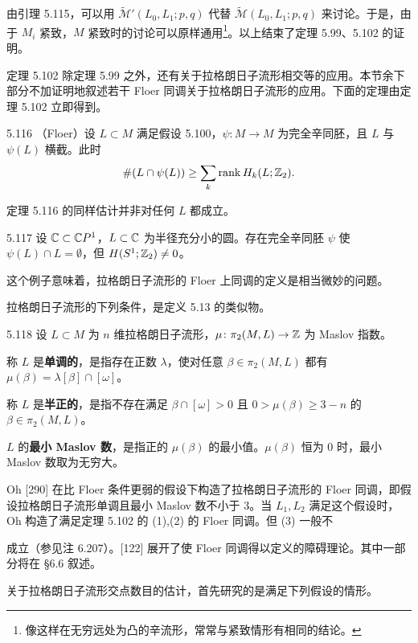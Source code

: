 由引理 5.115，可以用 $\tilde{\mathcal{M}}'(L_0,L_1;p,q)$ 代替 $\tilde{\mathcal{M}}(L_0,L_1;p,q)$ 来讨论。于是，由于 $M_i$ 紧致，$M$ 紧致时的讨论可以原样通用\footnote{像这样在无穷远处为凸的辛流形，常常与紧致情形有相同的结论。}。以上结束了定理 5.99、5.102 的证明。

定理 5.102 除定理 5.99 之外，还有关于拉格朗日子流形相交等的应用。本节余下部分不加证明地叙述若干 Floer 同调关于拉格朗日子流形的应用。下面的定理由定理 5.102 立即得到。

\begin{theorem}{5.116}
  （Floer）设 $L\subset M$ 满足假设 5.100，$\psi\colon M\to M$ 为完全辛同胚，且 $L$ 与 $\psi(L)$ 横截。此时
  \[
    \#(L\cap\psi(L))\ge\sum_k\mathrm{rank}\,H_k(L;\mathbb{Z}_2).
  \]
\end{theorem}

定理 5.116 的同样估计并非对任何 $L$ 都成立。

\begin{example}{5.117}
  设 $\mathbb{C}\subset\mathbb{C}P^1$，$L\subset\mathbb{C}$ 为半径充分小的圆。存在完全辛同胚 $\psi$ 使 $\psi(L)\cap L=\emptyset$，但 $H(S^1;\mathbb{Z}_2)\neq0$。
\end{example}

这个例子意味着，拉格朗日子流形的 Floer 上同调的定义是相当微妙的问题。

拉格朗日子流形的下列条件，是定义 5.13 的类似物。

\begin{definition}{5.118}
  设 $L\subset M$ 为 $n$ 维拉格朗日子流形，$\mu\colon\pi_2(M,L)\to\mathbb{Z}$ 为 Maslov 指数。

  称 $L$ 是\textbf{单调的}，是指存在正数 $\lambda$，使对任意 $\beta\in\pi_2(M,L)$ 都有 $\mu(\beta)=\lambda[\beta]\cap[\omega]$。

  称 $L$ 是\textbf{半正的}，是指不存在满足 $\beta\cap[\omega]>0$ 且 $0>\mu(\beta)\ge3-n$ 的 $\beta\in\pi_2(M,L)$。

  $L$ 的\textbf{最小 Maslov 数}，是指正的 $\mu(\beta)$ 的最小值。$\mu(\beta)$ 恒为 0 时，最小 Maslov 数取为无穷大。
\end{definition}

Oh [290] 在比 Floer 条件更弱的假设下构造了拉格朗日子流形的 Floer 同调，即假设拉格朗日子流形单调且最小 Maslov 数不小于 3。当 $L_1,L_2$ 满足这个假设时，Oh 构造了满足定理 5.102 的 (1),(2) 的 Floer 同调。但 (3) 一般不

成立（参见注 6.207）。[122] 展开了使 Floer 同调得以定义的障碍理论。其中一部分将在 §6.6 叙述。

关于拉格朗日子流形交点数目的估计，首先研究的是满足下列假设的情形。

